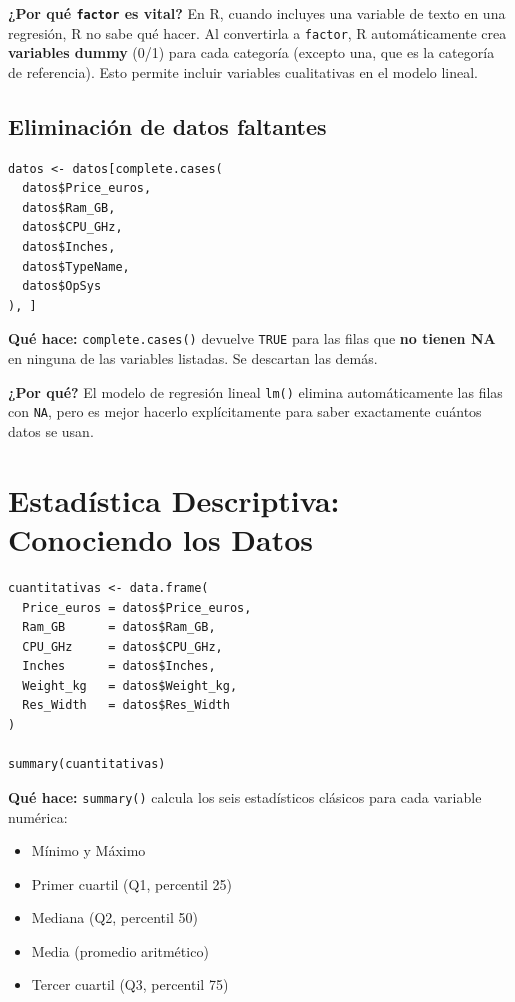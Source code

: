\documentclass[12pt,a4paper]{article}
\begin{document}
\textbf{¿Por qué \texttt{factor} es vital?} En R, cuando incluyes una variable de texto en una regresión, R no sabe qué hacer. Al convertirla a \texttt{factor}, R automáticamente crea \textbf{variables dummy} (0/1) para cada categoría (excepto una, que es la categoría de referencia). Esto permite incluir variables cualitativas en el modelo lineal.

\subsection{Eliminación de datos faltantes}

\begin{lstlisting}[caption={Filtrando filas completas}]
datos <- datos[complete.cases(
  datos$Price_euros,
  datos$Ram_GB,
  datos$CPU_GHz,
  datos$Inches,
  datos$TypeName,
  datos$OpSys
), ]
\end{lstlisting}

\textbf{Qué hace:} \texttt{complete.cases()} devuelve \texttt{TRUE} para las filas que \textbf{no tienen NA} en ninguna de las variables listadas. Se descartan las demás.

\textbf{¿Por qué?} El modelo de regresión lineal \texttt{lm()} elimina automáticamente las filas con \texttt{NA}, pero es mejor hacerlo explícitamente para saber exactamente cuántos datos se usan.

\section{Estadística Descriptiva: Conociendo los Datos}

\begin{lstlisting}[caption={Resumen descriptivo}]
cuantitativas <- data.frame(
  Price_euros = datos$Price_euros,
  Ram_GB      = datos$Ram_GB,
  CPU_GHz     = datos$CPU_GHz,
  Inches      = datos$Inches,
  Weight_kg   = datos$Weight_kg,
  Res_Width   = datos$Res_Width
)

summary(cuantitativas)
\end{lstlisting}

\textbf{Qué hace:} \texttt{summary()} calcula los seis estadísticos clásicos para cada variable numérica:
\begin{itemize}
    \item Mínimo y Máximo
    \item Primer cuartil (Q1, percentil 25)
    \item Mediana (Q2, percentil 50)
    \item Media (promedio aritmético)
    \item Tercer cuartil (Q3, percentil 75)
\end{itemize}
\end{document}
